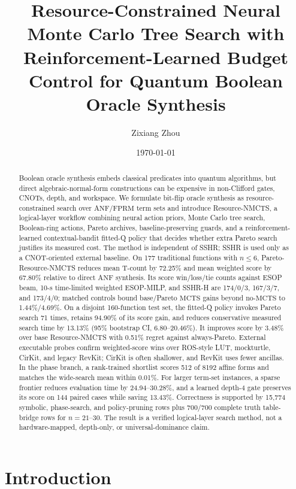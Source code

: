 \documentclass[11pt]{article}
\title{Resource-Constrained Neural Monte Carlo Tree Search with Reinforcement-Learned Budget Control for Quantum Boolean Oracle Synthesis}
\author{Zixiang Zhou}
\date{\today}
\newcommand{\method}{Resource-NMCTS}
\newcommand{\anf}{\ensuremath{\mathrm{ANF}}}
\newcommand{\fprm}{\ensuremath{\mathrm{FPRM}}}
\newcommand{\mcts}{\ensuremath{\mathrm{MCTS}}}
\newcommand{\ttable}{truth table}
\begin{document}
\maketitle

\begin{abstract}
Boolean oracle synthesis embeds classical predicates into quantum algorithms,
but direct algebraic-normal-form constructions can be expensive in
non-Clifford gates, CNOTs, depth, and workspace.  We formulate bit-flip oracle
synthesis as resource-constrained search over \anf{}/\fprm{} term sets and
introduce \method{}, a logical-layer workflow combining neural action priors,
Monte Carlo tree search, Boolean-ring actions, Pareto archives,
baseline-preserving guards, and a reinforcement-learned contextual-bandit
fitted-Q policy that decides whether extra Pareto search justifies its measured
cost.  The method is independent of SSHR; SSHR is used only as a CNOT-oriented
external baseline.  On 177 traditional functions with $n\leq6$,
Pareto-\method{} reduces mean T-count by 72.25\% and mean weighted score by
67.80\% relative to direct \anf{} synthesis.  Its score win/loss/tie counts
against ESOP beam, 10-s time-limited weighted ESOP-MILP, and SSHR-H are
174/0/3, 167/3/7, and 173/4/0; matched controls bound base/Pareto \mcts{} gains
beyond no-\mcts{} to 1.44\%/4.69\%.  On a disjoint 160-function test set, the
fitted-Q policy invokes Pareto search 71 times, retains 94.90\% of its score
gain, and reduces conservative measured search time by 13.13\% (95\%
bootstrap CI, 6.80--20.46\%).  It improves score by 3.48\% over base
\method{} with 0.51\% regret against always-Pareto.  External executable
probes confirm weighted-score wins over ROS-style LUT, mockturtle, CirKit, and
legacy RevKit; CirKit is often shallower, and RevKit uses fewer ancillas.  In the phase branch, a rank-trained shortlist scores 512 of
8192 affine forms and matches the wide-search mean within 0.01\%.  For larger
term-set instances, a sparse frontier reduces evaluation time by
24.94--30.28\%, and a learned depth-4 gate preserves its score on 144 paired
cases while saving 13.43\%.  Correctness is supported by
15,774 symbolic, phase-search, and policy-pruning rows plus 700/700 complete
\ttable{}-bridge rows for $n=21$--$30$.  The result is a verified logical-layer
search method, not a hardware-mapped, depth-only, or universal-dominance claim.
\end{abstract}

\section{Introduction}
\end{document}
